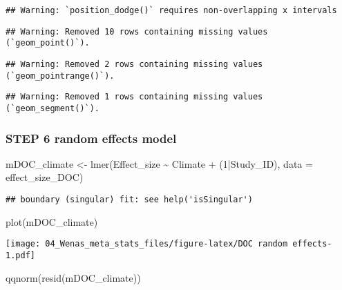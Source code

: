 \documentclass[
]{article}
\newenvironment{Shaded}{\begin{snugshade}}{\end{snugshade}}
\newcommand{\AttributeTok}[1]{\textcolor[rgb]{0.77,0.63,0.00}{#1}}
\newcommand{\DecValTok}[1]{\textcolor[rgb]{0.00,0.00,0.81}{#1}}
\newcommand{\FunctionTok}[1]{\textcolor[rgb]{0.00,0.00,0.00}{#1}}
\newcommand{\NormalTok}[1]{#1}
\newcommand{\OtherTok}[1]{\textcolor[rgb]{0.56,0.35,0.01}{#1}}
\newcommand{\SpecialCharTok}[1]{\textcolor[rgb]{0.00,0.00,0.00}{#1}}
\begin{document}
\begin{verbatim}
## Warning: `position_dodge()` requires non-overlapping x intervals
\end{verbatim}

\begin{verbatim}
## Warning: Removed 10 rows containing missing values (`geom_point()`).
\end{verbatim}

\begin{verbatim}
## Warning: Removed 2 rows containing missing values (`geom_pointrange()`).
\end{verbatim}

\begin{verbatim}
## Warning: Removed 1 rows containing missing values (`geom_segment()`).
\end{verbatim}

\hypertarget{step-6-random-effects-model}{%
\subsubsection{STEP 6 random effects
model}\label{step-6-random-effects-model}}

\begin{Shaded}
\begin{Highlighting}[]
\NormalTok{mDOC\_climate }\OtherTok{\textless{}{-}} \FunctionTok{lmer}\NormalTok{(Effect\_size }\SpecialCharTok{\textasciitilde{}}\NormalTok{ Climate }\SpecialCharTok{+}\NormalTok{ (}\DecValTok{1}\SpecialCharTok{|}\NormalTok{Study\_ID), }\AttributeTok{data =}\NormalTok{ effect\_size\_DOC)}
\end{Highlighting}
\end{Shaded}

\begin{verbatim}
## boundary (singular) fit: see help('isSingular')
\end{verbatim}

\begin{Shaded}
\begin{Highlighting}[]
\FunctionTok{plot}\NormalTok{(mDOC\_climate)}
\end{Highlighting}
\end{Shaded}

\texttt{[image: 04\_Wenas\_meta\_stats\_files/figure-latex/DOC random effects-1.pdf]}

\begin{Shaded}
\begin{Highlighting}[]
\FunctionTok{qqnorm}\NormalTok{(}\FunctionTok{resid}\NormalTok{(mDOC\_climate))}
\end{Highlighting}
\end{Shaded}
\end{document}
